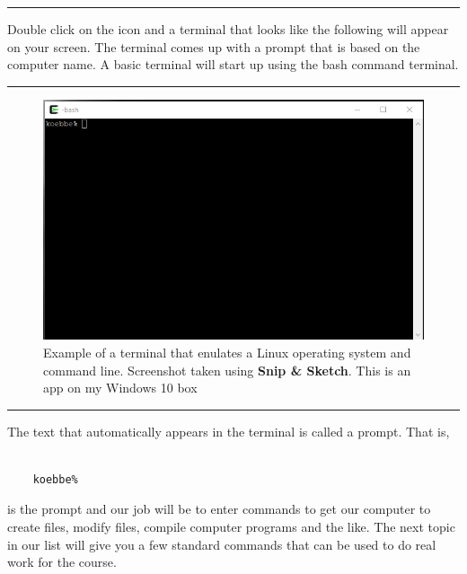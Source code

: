 \documentclass[10pt,fleqn]{article}
\begin{document}
\eject
\vskip0.1in\hrule\vskip0.1in
Double click on the icon and a terminal that looks like the following will
appear on your screen. The terminal comes up with a prompt that is based on the
computer name. A basic terminal will start up using the bash command terminal. 
\vskip0.1in\hrule\vskip0.1in
\vfill
\begin{figure}[h]
\centering
\includegraphics[width=6.0in]{../images/cygwin_01.png}
\caption{Example of a terminal that enulates a Linux operating system and
        command line. {Screenshot} taken using {\bf Snip \& Sketch}. This is
        an app on my Windows 10 box}
\end{figure}
\eject
\vskip0.1in\hrule\vskip0.1in
The text that automatically appears in the terminal is called a prompt. That
is,
\begin{verbatim}

    koebbe%

\end{verbatim}
is the prompt and our job will be to enter commands to get our computer to 
create files, modify files, compile computer programs and the like. The next
topic in our list will give you a few standard commands that can be used to
do real work for the course.
\end{document}
